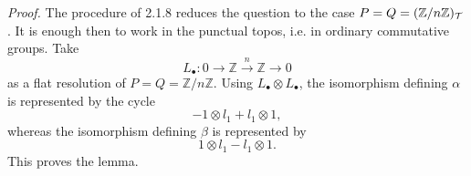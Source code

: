 \documentclass[11pt]{article}
\begin{document}
\emph{Proof.}  The procedure of 2.1.8 reduces the question to the case \(P=Q=(\mathbb Z/n\mathbb Z)_\mathcal T\).  It is enough then to work in the punctual topos, i.e. in ordinary commutative groups.  Take
\[
        L_\bullet:0\longrightarrow\mathbb Z\xrightarrow{n}\mathbb Z\longrightarrow0
\]
as a flat resolution of \(P=Q=\mathbb Z/n\mathbb Z\).  Using \(L_\bullet\otimes L_\bullet\), the isomorphism defining \(\alpha\) is represented by the cycle
\[
        -1\otimes l_1+l_1\otimes1,
\]
whereas the isomorphism defining \(\beta\) is represented by
\[
        1\otimes l_1-l_1\otimes1.
\]
This proves the lemma.
\end{document}
